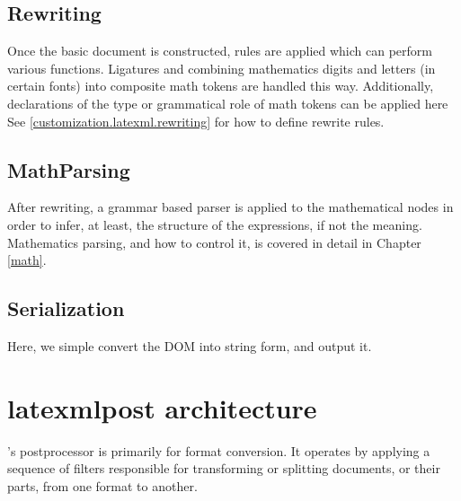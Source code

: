 \documentclass{book}
\begin{document}
\subsection{Rewriting}\label{architecture.rewriting}
%
Once the basic document is constructed,  rules are applied which can
perform various functions. Ligatures and combining mathematics digits and letters (in certain fonts)
into composite math tokens are handled this way.  Additionally, declarations
of the type or grammatical role of math tokens can be applied here
See \ref{customization.latexml.rewriting} for how to define rewrite rules.

\subsection{MathParsing}\label{architecture.mathparsing}
%
After rewriting, a grammar based parser is applied to the mathematical
nodes in order to infer, at least, the structure of the expressions,
if not the meaning.
Mathematics parsing, and how to control it, is covered in detail in Chapter \ref{math}.

\subsection{Serialization}\label{architecture.serialization}
Here, we simple convert the DOM into string form, and output it.

\section{latexmlpost architecture}\label{latexmlpostarchitecture}
%
\LaTeXML's postprocessor is primarily for format conversion.
It operates by applying a sequence of filters responsible for
transforming or splitting documents, or their parts, from one format to another.
\end{document}
